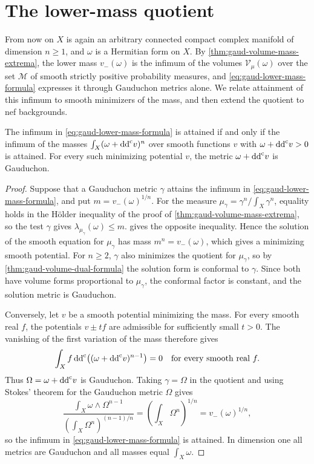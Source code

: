 \section{The lower-mass quotient}
\label{sec:lower-mass-quotient}

From now on $X$ is again an arbitrary connected compact complex manifold of dimension $n\geq1$, and $\omega$ is a Hermitian form on $X$. By \cref{thm:gaud-volume-mass-extrema}, the lower mass $v_-(\omega)$ is the infimum of the volumes $\mathcal V_\mu(\omega)$ over the set $\mathscr M$ of smooth strictly positive probability measures, and \eqref{eq:gaud-lower-mass-formula} expresses it through Gauduchon metrics alone. We relate attainment of this infimum to smooth minimizers of the mass, and then extend the quotient to nef backgrounds.

\begin{proposition}\label{prop:lower-mass-smooth-attainment}
The infimum in \eqref{eq:gaud-lower-mass-formula} is attained if and only if the infimum of the masses $\int_X(\omega+\mathrm{dd}^{\mathrm{c}} v)^n$ over smooth functions $v$ with $\omega+\mathrm{dd}^{\mathrm{c}} v>0$ is attained. For every such minimizing potential $v$, the metric $\omega+\mathrm{dd}^{\mathrm{c}} v$ is Gauduchon.
\end{proposition}
\begin{proof}
Suppose that a Gauduchon metric $\gamma$ attains the infimum in \eqref{eq:gaud-lower-mass-formula}, and put $m=v_-(\omega)^{1/n}$. For the measure $\mu_\gamma=\gamma^n/\int_X\gamma^n$, equality holds in the H\"older inequality of the proof of \cref{thm:gaud-volume-mass-extrema}, so the test $\gamma$ gives
$\lambda_{\mu_\gamma}(\omega)\leq m$.
 gives the opposite inequality. Hence the solution of the smooth equation for $\mu_\gamma$ has mass $m^n=v_-(\omega)$, which gives a minimizing smooth potential. For $n\geq2$, $\gamma$ also minimizes the quotient for $\mu_\gamma$, so by \cref{thm:gaud-volume-dual-formula} the solution form is conformal to $\gamma$. Since both have volume forms proportional to $\mu_\gamma$, the conformal factor is constant, and the solution metric is Gauduchon.

Conversely, let $v$ be a smooth potential minimizing the mass. For every smooth real $f$, the potentials $v\pm tf$ are admissible for sufficiently small $t>0$. The vanishing of the first variation of the mass therefore gives
\[
 \int_X f\,\mathrm{dd}^{\mathrm{c}}\bigl((\omega+\mathrm{dd}^{\mathrm{c}} v)^{n-1}\bigr)=0
 \quad\hbox{for every smooth real }f.
\]
Thus $\Omega=\omega+\mathrm{dd}^{\mathrm{c}} v$ is Gauduchon. Taking $\gamma=\Omega$ in the quotient and using Stokes' theorem for the Gauduchon metric $\Omega$ gives
\[
 \frac{\int_X\omega\wedge\Omega^{n-1}}
      {(\int_X\Omega^n)^{(n-1)/n}}
             =(\int_X\Omega^n)^{1/n}=v_-(\omega)^{1/n},
\]
so the infimum in \eqref{eq:gaud-lower-mass-formula} is attained. In dimension one all metrics are Gauduchon and all masses equal $\int_X\omega$.
\end{proof}

